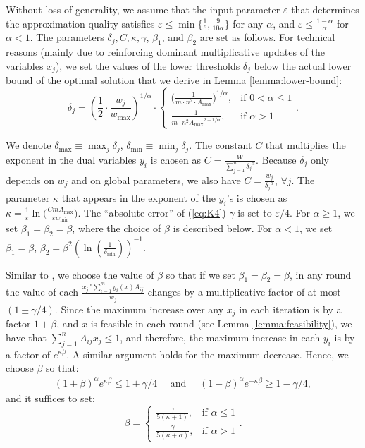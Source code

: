 \documentclass[11pt]{article}
\begin{document}
Without loss of generality, we assume that the input parameter $\varepsilon$ that determines the approximation quality satisfies $\varepsilon\leq \min\{\frac{1}{6}, \frac{9}{10\alpha}\}$ for any $\alpha$, and $\varepsilon\leq \frac{1-\alpha}{\alpha}$ for $\alpha<1$. 
The parameters $\delta_j, C, \kappa, \gamma$, $\beta_1$, and $\beta_2$ are set as follows. For technical reasons (mainly due to reinforcing dominant multiplicative updates of the variables $x_j$), we set the values of the lower thresholds $\delta_j$ below the actual lower bound of the optimal solution that we derive in Lemma \ref{lemma:lower-bound}:
\begin{equation*}
\delta_j = \left(\frac{1}{2}\cdot \frac{w_j}{w_{\max}}\right)^{1/\alpha}\cdot\begin{cases} \big(\frac{1}{m\cdot n^2\cdot A_{\max}}\big)^{1/\alpha}, & \mbox{if } 0<\alpha\leq 1\\
\frac{1}{m\cdot n^2 {A_{\max}}^{2-1/\alpha}}, & \mbox{if } \alpha> 1 \end{cases}.
\end{equation*}

We denote $\delta_{\max}\equiv \max_j \delta_j$, $\delta_{\min}\equiv \min_j \delta_j$. 
The constant $C$ that multiplies the exponent in the dual variables $y_i$ is chosen as $C = \frac{W}{\sum_{j=1}^n {\delta_j}^\alpha}$. Because  $\delta_j$ only depends on $w_j$ and on global parameters,  we also have $C = \frac{w_j}{{\delta_j}^\alpha}$, $\forall j$. The parameter $\kappa$ that appears in the exponent of the $y_i$'s is chosen as $\kappa = \frac{1}{\varepsilon}\ln\big(\frac{C m A_{\max}}{\varepsilon  w_{\min}}\big)$. The ``absolute error'' of (\ref{eq:K4}) $\gamma$ is set to $\varepsilon/4$. For $\alpha \geq 1$, we set $\beta_1 = \beta_2 = \beta$, where the choice of $\beta$ is described below. For $\alpha < 1$, we set $\beta_1 = \beta$, $\beta_2 = \beta^2 (\ln(\frac{1}{\delta_{\min}}))^{-1}$.

Similar to  \cite{AwerbuchKhandekar2009}, we choose the value of $\beta$ so that if we set $\beta_1=\beta_2 = \beta$, in any round the value of each $\frac{{x_j}^\alpha \sum_{i=1}^m y_i(x)A_{ij}}{w_j}$ changes by a multiplicative factor of at most $(1\pm \gamma/4)$. Since the maximum increase over any $x_j$ in each iteration is by a factor $1+\beta$, and $x$ is feasible in each round (see Lemma \ref{lemma:feasibility}), we have that $\sum_{j=1}^n A_{ij}x_j\leq 1$, and therefore, the maximum increase in each $y_i$ is by a factor of $e^{\kappa\beta}$. A similar argument holds for the maximum decrease.  Hence, we choose $\beta$ so that:
\begin{align*}
(1+\beta)^{\alpha}e^{\kappa\beta}\leq 1+\gamma/4 \quad\text{ and }\quad
(1-\beta)^{\alpha}e^{-\kappa\beta}\geq 1-\gamma/4,
\end{align*}
and it suffices to set:
\begin{equation*}
\beta = \begin{cases} \frac{\gamma}{5(\kappa+1)}, & \mbox{if } \alpha\leq 1 \\
\frac{\gamma}{5(\kappa+\alpha)}, & \mbox{if } \alpha> 1 \end{cases}.
\end{equation*}
\end{document}
